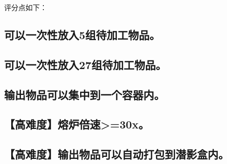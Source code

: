 \documentclass{exampaper}
\begin{document}
            评分点如下：

            \subsection{可以一次性放入5组待加工物品。}

            \subsection{可以一次性放入27组待加工物品。}

            \subsection{输出物品可以集中到一个容器内。}

            \subsection{【高难度】熔炉倍速>=30x。}

            \subsection{【高难度】输出物品可以自动打包到潜影盒内。}
\end{document}
